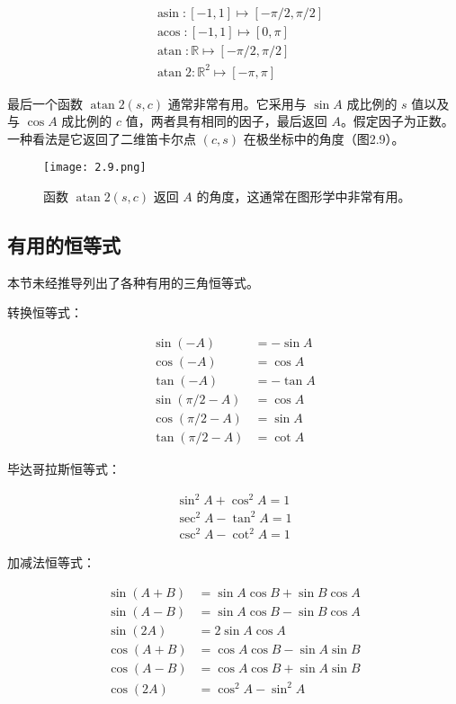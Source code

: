 \documentclass[lang=cn,12pt]{elegantbook}
\begin{document}
\begin{equation}
\begin{aligned}
&\operatorname{asin}:[-1,1] \mapsto[-\pi / 2, \pi / 2] \\
&\operatorname{acos}:[-1,1] \mapsto[0, \pi] \\
&\operatorname{atan}: \mathbb{R} \mapsto[-\pi / 2, \pi / 2] \\
&\operatorname{atan} 2: \mathbb{R}^{2} \mapsto[-\pi, \pi]
\end{aligned}
\end{equation}

最后一个函数 $\operatorname{atan} 2(s,c)$ 通常非常有用。它采用与 $\sin A$ 成比例的 $s$ 值以及与 $\cos A$ 成比例的 $c$ 值，两者具有相同的因子，最后返回 $A$。假定因子为正数。一种看法是它返回了二维笛卡尔点 $(c,s)$ 在极坐标中的角度（图2.9）。

\begin{figure}[htbp]
\centering
\texttt{[image: 2.9.png]}
\caption{函数 $\operatorname{atan} 2(s,c)$ 返回 $A$ 的角度，这通常在图形学中非常有用。}
\end{figure}

\subsection{有用的恒等式}

本节未经推导列出了各种有用的三角恒等式。

转换恒等式：

$$
\begin{aligned}
\sin (-A) &=-\sin A \\
\cos (-A) &=\cos A \\
\tan (-A) &=-\tan A \\
\sin (\pi / 2-A) &=\cos A \\
\cos (\pi / 2-A) &=\sin A \\
\tan (\pi / 2-A) &=\cot A
\end{aligned}
$$

毕达哥拉斯恒等式：

$$
\begin{array}{r}
\sin ^{2} A+\cos ^{2} A=1 \\
\sec ^{2} A-\tan ^{2} A=1 \\
\csc ^{2} A-\cot ^{2} A=1
\end{array}
$$

加减法恒等式：

$$
\begin{aligned}
\sin (A+B) &=\sin A \cos B+\sin B \cos A \\
\sin (A-B) &=\sin A \cos B-\sin B \cos A \\
\sin (2 A) &=2 \sin A \cos A \\
\cos (A+B) &=\cos A \cos B-\sin A \sin B \\
\cos (A-B) &=\cos A \cos B+\sin A \sin B \\
\cos (2 A) &=\cos ^{2} A-\sin ^{2} A
\end{aligned}
$$
\end{document}
